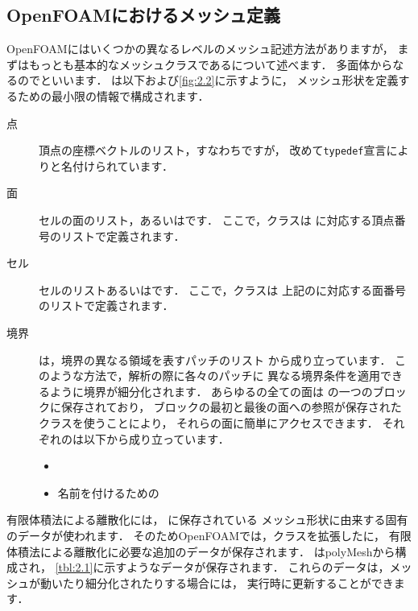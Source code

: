 \subsection{OpenFOAMにおけるメッシュ定義}
\label{ssec:2.3.1}
OpenFOAMにはいくつかの異なるレベルのメッシュ記述方法がありますが，
まずはもっとも基本的なメッシュクラスであるについて述べます．
多面体からなるのでといいます．
は以下および\autoref{fig:2.2}に示すように，
メッシュ形状を定義するための最小限の情報で構成されます．
\begin{description}
 \item[点] 頂点の座標ベクトルのリスト，すなわちですが，
            改めて\texttt{typedef}宣言によりと名付けられています．
 \item[面] セルの面のリスト，あるいはです．
            ここで，クラスは
            に対応する頂点番号のリストで定義されます．
 \item[セル] セルのリストあるいはです．
            ここで，クラスは
            上記のに対応する面番号のリストで定義されます．
 \item[境界] は，境界の異なる領域を表すパッチのリスト
            から成り立っています．
            このような方法で，解析の際に各々のパッチに
            異なる境界条件を適用できるように境界が細分化されます．
            あらゆるの全ての面は
            の一つのブロックに保存されており，
            ブロックの最初と最後の面への参照が保存された
            クラスを使うことにより，
            それらの面に簡単にアクセスできます．
            それぞれのは以下から成り立っています．
            \begin{itemize}
             \item {}
             \item 名前を付けるための
            \end{itemize}
\end{description}

有限体積法による離散化には，
に保存されている
メッシュ形状に由来する固有のデータが使われます．
そのためOpenFOAMでは，クラスを拡張したに，
有限体積法による離散化に必要な追加のデータが保存されます．
は{polyMesh}から構成され，
\autoref{tbl:2.1}に示すようなデータが保存されます．
これらのデータは，メッシュが動いたり細分化されたりする場合には，
実行時に更新することができます．


